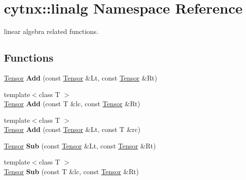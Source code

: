 \hypertarget{namespacecytnx_1_1linalg}{}\section{cytnx\+:\+:linalg Namespace Reference}
\label{namespacecytnx_1_1linalg}


linear algebra related functions.  


\subsection*{Functions}
\begin{DoxyCompactItemize}
\item 
\mbox{\label{namespacecytnx_1_1linalg_af36e9e20e4c7d74f2f6f838902482d98}} 
\hyperlink{classcytnx_1_1Tensor}{Tensor} {\bfseries Add} (const \hyperlink{classcytnx_1_1Tensor}{Tensor} \&Lt, const \hyperlink{classcytnx_1_1Tensor}{Tensor} \&Rt)
\item 
\mbox{\label{namespacecytnx_1_1linalg_a33643657d8cc96b037818e2003c049c7}} 
{\footnotesize template$<$class T $>$ }\\\hyperlink{classcytnx_1_1Tensor}{Tensor} {\bfseries Add} (const T \&lc, const \hyperlink{classcytnx_1_1Tensor}{Tensor} \&Rt)
\item 
\mbox{\label{namespacecytnx_1_1linalg_ae158543bf09e9e6914eab96995015d9e}} 
{\footnotesize template$<$class T $>$ }\\\hyperlink{classcytnx_1_1Tensor}{Tensor} {\bfseries Add} (const \hyperlink{classcytnx_1_1Tensor}{Tensor} \&Lt, const T \&rc)
\item 
\mbox{\label{namespacecytnx_1_1linalg_a78477b25b3eed121847f1a13b878a925}} 
\hyperlink{classcytnx_1_1Tensor}{Tensor} {\bfseries Sub} (const \hyperlink{classcytnx_1_1Tensor}{Tensor} \&Lt, const \hyperlink{classcytnx_1_1Tensor}{Tensor} \&Rt)
\item 
\mbox{\label{namespacecytnx_1_1linalg_a4fa0cd62f3723518ae4e46db00d8be50}} 
{\footnotesize template$<$class T $>$ }\\\hyperlink{classcytnx_1_1Tensor}{Tensor} {\bfseries Sub} (const T \&lc, const \hyperlink{classcytnx_1_1Tensor}{Tensor} \&Rt)

\end{DoxyCompactItemize}
